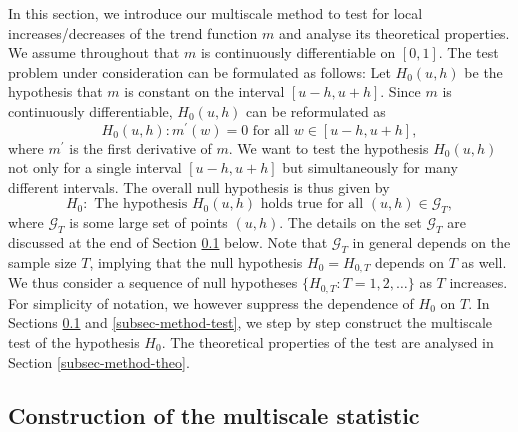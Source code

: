 In this section, we introduce our multiscale method to test for local increases/decreases of the trend function $m$ and analyse its theoretical properties. We assume throughout that $m$ is continuously differentiable on $[0,1]$. The test problem under consideration can be formulated as follows: Let $H_0(u,h)$ be the hypothesis that $m$ is constant on the interval $[u-h,u+h]$. Since $m$ is continuously differentiable, $H_0(u,h)$ can be reformulated as
\[ H_0(u,h): m^\prime(w) = 0 \text { for all } w \in [u-h,u+h], \]
where $m^\prime$ is the first derivative of $m$. We want to test the hypothesis $H_0(u,h)$ not only for a single interval $[u-h,u+h]$ but simultaneously for many different intervals. The overall null hypothesis is thus given by
\[ H_0: \text{ The hypothesis } H_0(u,h) \text{ holds true for all } (u,h) \in \mathcal{G}_T, \]
where $\mathcal{G}_T$ is some large set of points $(u,h)$. The details on the set $\mathcal{G}_T$ are discussed at the end of Section \ref{subsec-method-stat} below. Note that $\mathcal{G}_T$ in general depends on the sample size $T$, implying that the null hypothesis $H_0 = H_{0,T}$ depends on $T$ as well. We thus consider a sequence of null hypotheses $\{H_{0,T}: T = 1,2,\ldots \}$ as $T$ increases. For simplicity of notation, we however suppress the dependence of $H_0$ on $T$. In Sections \ref{subsec-method-stat} and \ref{subsec-method-test}, we step by step construct the multiscale test of the hypothesis $H_0$. The theoretical properties of the test are analysed in Section \ref{subsec-method-theo}. 


\subsection{Construction of the multiscale statistic}\label{subsec-method-stat}



